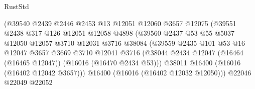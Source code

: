 \begin{lexlean}{RustStd}
\begin{coremodule}
                                      (@39540
                                        @2439
                                        @2446
                                        @2453
                                        @13
                                        @12051
                                        @12060
                                        @3657
                                        @12075
                                        (@39551
                                          @2438
                                          @317
                                          @126
                                          @12051
                                          @12058
                                          @4898
                                          (@39560
                                            @2437
                                            @53
                                            @55
                                            @5037
                                            @12050
                                            @12057
                                            @3710
                                            @12031
                                            @3716
                                            @38084
                                            (@39559
                                              @2435
                                              @101
                                              @53
                                              @16
                                              @12047
                                              @3657
                                              @3669
                                              @3710
                                              @12041
                                              @3716
                                              (@38044
                                                @2434
                                                @12047
                                                (@16464 (@16465 @12047))
                                                (@16016 (@16470 @2434 @53)))
                                              @38011
                                              @16400
                                              (@16016 (@16402 @12042 @3657)))
                                            @16400
                                            (@16016 (@16402 @12032 @12050)))
                                          @22046
                                          @22049
                                          @22052

\end{coremodule}
\end{lexlean}
